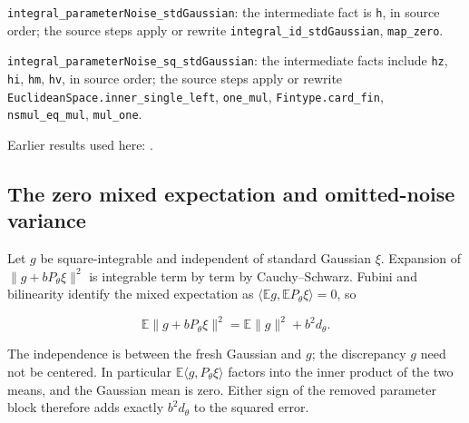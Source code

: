 \documentclass[11pt,a4paper]{report}
\begin{document}
\begin{leanbox}
\texttt{integral\_\allowbreak{}parameter\allowbreak{}Noise\_\allowbreak{}std\allowbreak{}Gaussian}: the intermediate fact is \texttt{h}, in source order; the source steps apply or rewrite \texttt{integral\_\allowbreak{}id\_\allowbreak{}std\allowbreak{}Gaussian}, \texttt{map\_\allowbreak{}zero}.



\texttt{integral\_\allowbreak{}parameter\allowbreak{}Noise\_\allowbreak{}sq\_\allowbreak{}std\allowbreak{}Gaussian}: the intermediate facts include \texttt{hz}, \texttt{hi}, \texttt{hm}, \texttt{hv}, in source order; the source steps apply or rewrite \texttt{Euclidean\allowbreak{}Space.\allowbreak{}inner\_\allowbreak{}single\_\allowbreak{}left}, \texttt{one\_\allowbreak{}mul}, \texttt{Fintype.\allowbreak{}card\_\allowbreak{}fin}, \texttt{nsmul\_\allowbreak{}eq\_\allowbreak{}mul}, \texttt{mul\_\allowbreak{}one}.
\end{leanbox}


Earlier results used here: \cite[Section~3.1.1]{LangevinLean2026IPLA}.
\subsection{\texorpdfstring{The zero mixed expectation and omitted-noise variance}{The zero mixed expectation and omitted-noise variance}}
\label{report-step-ProximalLangevin-MYPGDNoise-lean-3}


Let \(g\) be square-integrable and independent of standard Gaussian \(\xi\). Expansion of \(\|g+bP_\theta\xi\|^2\) is integrable term by term by Cauchy–Schwarz. Fubini and bilinearity identify the mixed expectation as \(\langle\mathbb E g,\mathbb E P_\theta\xi\rangle=0\), so

\[\mathbb E\|g+bP_\theta\xi\|^2=\mathbb E\|g\|^2+b^2d_\theta.\]

The independence is between the fresh Gaussian and \(g\); the discrepancy \(g\) need not be centered. In particular \(\mathbb E\langle g,P_\theta\xi\rangle\) factors into the inner product of the two means, and the Gaussian mean is zero. Either sign of the removed parameter block therefore adds exactly \(b^2d_\theta\) to the squared error.
\end{document}

